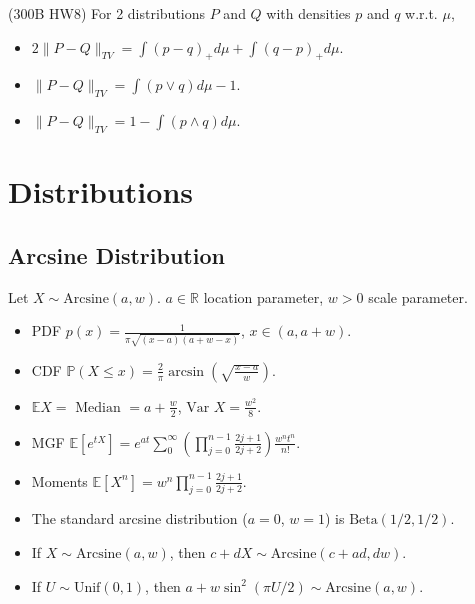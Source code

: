 \documentclass[twoside]{article}
\newcommand{\dis}{\displaystyle}
\newcommand\bbE{\mathbb{E}}
\newcommand\bbP{\mathbb{P}}
\newcommand\bbR{\mathbb{R}}
\newcommand\var{\text{Var }}
\begin{document}
\begin{itemize}
(300B HW8) For 2 distributions $P$ and $Q$ with densities $p$ and $q$ w.r.t. $\mu$,
\begin{itemize}
\item $2 \|P-Q\|_{TV} = \int (p-q)_+ d\mu + \int (q-p)_+ d\mu$.
\item $\|P-Q\|_{TV} = \int (p \vee q) d\mu - 1$.
\item $\|P-Q\|_{TV} = 1 - \int (p \wedge q)d\mu$.
\end{itemize}

\end{itemize}


\section{Distributions}
\subsection{Arcsine Distribution}
Let $X \sim \text{Arcsine}(a, w)$. $a \in \bbR$ location parameter, $w > 0$ scale parameter.
\begin{itemize}
\item PDF $p(x) = \dis\frac{1}{\pi \sqrt{(x-a)(a+w-x)}}$, $x \in (a, a+w)$.

\item CDF $\bbP (X \leq x) = \dis\frac{2}{\pi} \arcsin \left( \sqrt{\frac{x-a}{w}}\right)$.

\item $\bbE X = \text{ Median } = a + \dis\frac{w}{2}$, $\var X = \dis\frac{w^2}{8}$.

\item MGF $\bbE [e^{tX}] = e^{at} \dis\sum_0^\infty \left(\prod_{j=0}^{n-1}\frac{2j+1}{2j+2} \right)\frac{w^n t^n}{n!}$.

\item Moments $\bbE [X^n] = w^n \dis\prod_{j=0}^{n-1}\frac{2j+1}{2j+2}$.

\item The standard arcsine distribution ($a = 0$, $w = 1$) is $\text{Beta}(1/2, 1/2)$.

\item If $X \sim \text{Arcsine}(a,w)$, then $c + dX \sim \text{Arcsine}(c+ad,dw)$.

\item If $U \sim \text{Unif}(0,1)$, then $a + w \sin^2 (\pi U / 2) \sim \text{Arcsine}(a,w)$.

\end{itemize}
\end{document}
